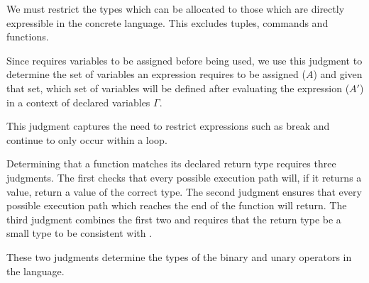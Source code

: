 \begin{mathpar}
\end{mathpar}

We must restrict the types which can be allocated to those which are directly expressible in the concrete language. This excludes tuples, commands and functions.

\begin{mathpar}
\end{mathpar}

Since \langname{} requires variables to be assigned before being used, we use this judgment to determine the set of variables an expression requires to be assigned ($A$) and given that set, which set of variables will be defined after evaluating the expression ($A'$) in a context of declared variables $\Gamma$.

\begin{mathpar}
\end{mathpar}

This judgment captures the need to restrict expressions such as break and continue to only occur within a loop.

\begin{mathpar}


\end{mathpar}

Determining that a function matches its declared return type requires three judgments. The first checks that every possible execution path will, if it returns a value, return a value of the correct type. The second judgment ensures that every possible execution path which reaches the end of the function will return. The third judgment combines the first two and requires that the return type be a small type to be consistent with \langname{}.

\begin{mathpar}

\end{mathpar}

These two judgments determine the types of the binary and unary operators in the language.

\begin{mathpar}
\end{mathpar}

